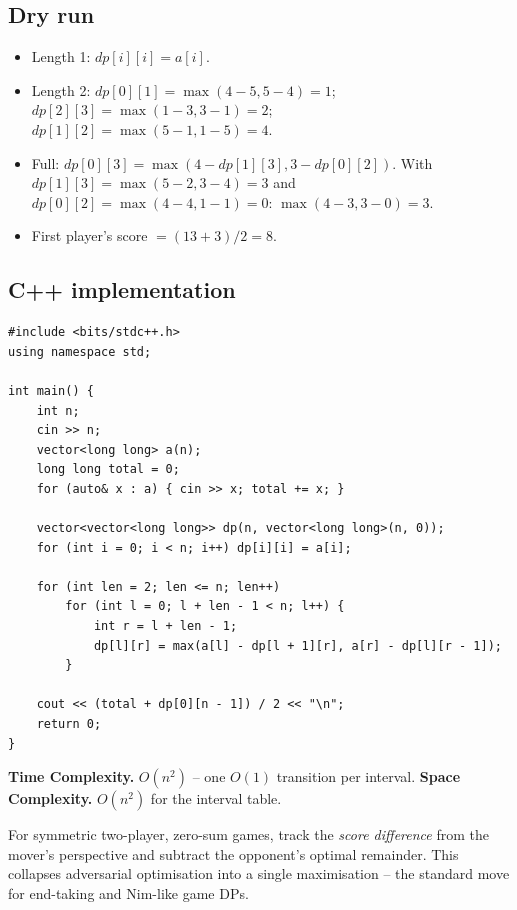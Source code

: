 \subsection*{Dry run}


\begin{itemize}
  \item Length 1: $\textit{dp}[i][i]=a[i]$.
  \item Length 2: $\textit{dp}[0][1]=\max(4-5,5-4)=1$;
        $\textit{dp}[2][3]=\max(1-3,3-1)=2$; $\textit{dp}[1][2]=\max(5-1,
        1-5)=4$.
  \item Full: $\textit{dp}[0][3]=\max(4-\textit{dp}[1][3],
        3-\textit{dp}[0][2])$. With $\textit{dp}[1][3]=\max(5-2,3-4)=3$
        and $\textit{dp}[0][2]=\max(4-4,1-1)=0$: $\max(4-3,3-0)=3$.
  \item First player's score $=(13+3)/2=8$.
\end{itemize}

\subsection*{C++ implementation}

\begin{lstlisting}
#include <bits/stdc++.h>
using namespace std;

int main() {
    int n;
    cin >> n;
    vector<long long> a(n);
    long long total = 0;
    for (auto& x : a) { cin >> x; total += x; }

    vector<vector<long long>> dp(n, vector<long long>(n, 0));
    for (int i = 0; i < n; i++) dp[i][i] = a[i];

    for (int len = 2; len <= n; len++)
        for (int l = 0; l + len - 1 < n; l++) {
            int r = l + len - 1;
            dp[l][r] = max(a[l] - dp[l + 1][r], a[r] - dp[l][r - 1]);
        }

    cout << (total + dp[0][n - 1]) / 2 << "\n";
    return 0;
}
\end{lstlisting}

\begin{complexitybox}
\textbf{Time Complexity.} $O(n^2)$ -- one $O(1)$ transition per interval.
\textbf{Space Complexity.} $O(n^2)$ for the interval table.
\end{complexitybox}

\begin{takeawaybox}
For symmetric two-player, zero-sum games, track the \emph{score
difference} from the mover's perspective and subtract the opponent's
optimal remainder. This collapses adversarial optimisation into a single
maximisation -- the standard move for end-taking and Nim-like game DPs.
\end{takeawaybox}
